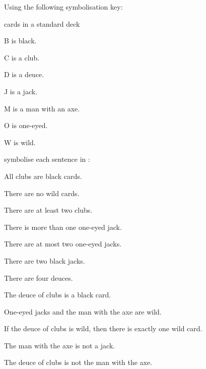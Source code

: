 \problempart
\label{pr.FOLcards}
Using the following symbolisation key:
\begin{ekey}
\item[\text{domain}] cards in a standard deck
\item[B\meta{x}]  is black.
\item[C\meta{x}]  is a club.
\item[D\meta{x}]  is a deuce.
\item[J\meta{x}]  is a jack.
\item[M\meta{x}]  is a man with an axe.
\item[O\meta{x}]  is one-eyed.
\item[W\meta{x}]  is wild.
\end{ekey}
symbolise each sentence in \FOL:
\begin{earg}
\item All clubs are black cards.
\item There are no wild cards.
\item There are at least two clubs.
\item There is more than one one-eyed jack.
\item There are at most two one-eyed jacks.
\item There are two black jacks.
\item There are four deuces.
\item The deuce of clubs is a black card.
\item One-eyed jacks and the man with the axe are wild.
\item If the deuce of clubs is wild, then there is exactly one wild card.
\item The man with the axe is not a jack.
\item The deuce of clubs is not the man with the axe.
\end{earg}


